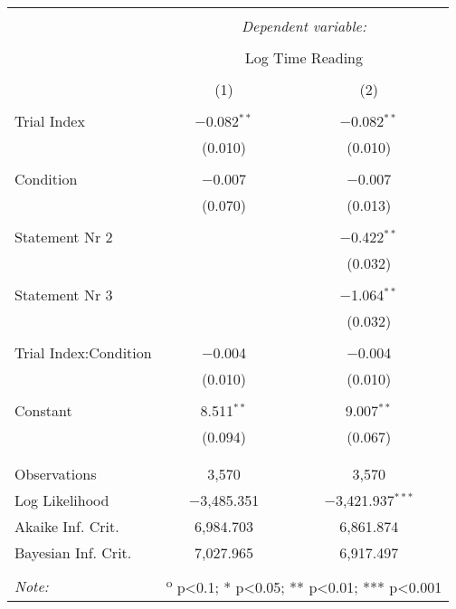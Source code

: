 
\begin{table} \centering
  \small
  \caption{}
  \label{table:read}
  \renewcommand{\arraystretch}{0.6}
\begin{tabular}{@{\extracolsep{5pt}}lcc}
\\[-1.8ex]\hline
\hline \\[-1.8ex]
 & \multicolumn{2}{c}{\textit{Dependent variable:}} \\
\cline{2-3}
\\[-1.8ex] & \multicolumn{2}{c}{Log Time Reading} \\
\\[-1.8ex] & (1) & (2)\\
\hline \\[-1.8ex]
 Trial Index & $-$0.082$^{**}$ & $-$0.082$^{**}$ \\
  & (0.010) & (0.010) \\
  & & \\
 Condition & $-$0.007 & $-$0.007 \\
  & (0.070) & (0.013) \\
  & & \\
 Statement Nr 2 &  & $-$0.422$^{**}$ \\
  &  & (0.032) \\
  & & \\
 Statement Nr 3 &  & $-$1.064$^{**}$ \\
  &  & (0.032) \\
  & & \\
 Trial Index:Condition & $-$0.004 & $-$0.004 \\
  & (0.010) & (0.010) \\
  & & \\
 Constant & 8.511$^{**}$ & 9.007$^{**}$ \\
  & (0.094) & (0.067) \\
  & & \\
\hline \\[-1.8ex]
Observations & 3,570 & 3,570 \\
Log Likelihood & $-$3,485.351 & $-$3,421.937$^{***}$ \\
Akaike Inf. Crit. & 6,984.703 & 6,861.874 \\
Bayesian Inf. Crit. & 7,027.965 & 6,917.497 \\
\hline
\hline \\[-1.8ex]
\textit{Note:}  & \multicolumn{2}{r}{	\textsuperscript{o} p<0.1; * p<0.05; ** p<0.01; *** p<0.001} \\
\end{tabular}
\end{table}
